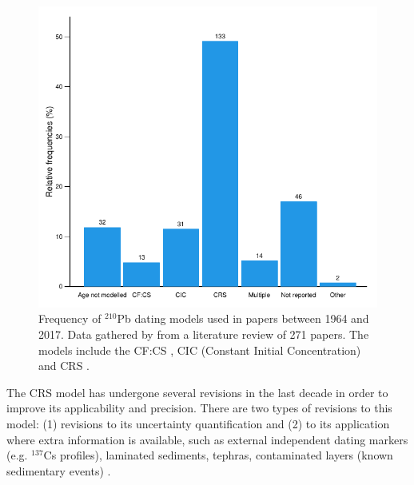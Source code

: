 \documentclass [10pt] {article}
\begin{document}
\begin{figure}[h!]
	\begin{centering}
		\includegraphics[width=.75\linewidth]{barras.pdf}
		\caption{Frequency of $^{210}$Pb dating models used in papers between 1964 and 2017. Data gathered by \citet{Courtney2019} from a literature review of 271 papers. The models include the CF:CS \citep[Constant Flux - Constant Sedimentation;][]{Robbins1978}, CIC (Constant Initial Concentration) \citep{Goldberg1963,Crozaz1964,Robbins1978} and CRS  \citep[Constant Rate of Supply;][]{Appleby1978,Robbins1978}. }
		\label{fig:210models}
	\end{centering}
\end{figure}

	The CRS model has undergone several revisions in the last decade in order to improve its applicability and precision. 
There are two types of revisions to this model: (1) revisions to its uncertainty quantification \citep[eg. ][]{Binford1990,Appleby2001,Sanchez-Cabeza2014} and (2) to its application where extra information is available, such as external independent dating markers (e.g. $^{137}$Cs profiles), laminated sediments, tephras, contaminated layers (known sedimentary events) \citep[e.g.][]{Appleby1998,Appleby2001,Appleby2008}. 
\end{document}
